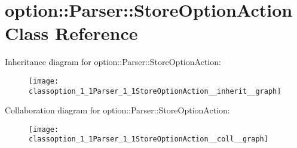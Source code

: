 \hypertarget{classoption_1_1Parser_1_1StoreOptionAction}{}\section{option\+:\+:Parser\+:\+:Store\+Option\+Action Class Reference}
\label{classoption_1_1Parser_1_1StoreOptionAction}


Inheritance diagram for option\+:\+:Parser\+:\+:Store\+Option\+Action\+:\nopagebreak
\begin{figure}[H]
\begin{center}
\leavevmode
\texttt{[image: classoption\_1\_1Parser\_1\_1StoreOptionAction\_\_inherit\_\_graph]}
\end{center}
\end{figure}


Collaboration diagram for option\+:\+:Parser\+:\+:Store\+Option\+Action\+:\nopagebreak
\begin{figure}[H]
\begin{center}
\leavevmode
\texttt{[image: classoption\_1\_1Parser\_1\_1StoreOptionAction\_\_coll\_\_graph]}
\end{center}
\end{figure}
